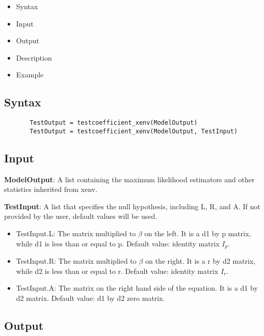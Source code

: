 \documentclass[a4paper,11pt,openany]{memoir}
\begin{document}
\begin{itemize}
\setlength{\itemsep}{-1ex}
   \item Syntax
   \item Input
   \item Output
   \item Description
   \item Example
\end{itemize}


\subsection*{Syntax}


\begin{verbatim}       TestOutput = testcoefficient_xenv(ModelOutput)
       TestOutput = testcoefficient_xenv(ModelOutput, TestInput)\end{verbatim}
    

\subsection*{Input}

\begin{par}
\textbf{ModelOutput}: A list containing the maximum likelihood estimators and other statistics inherited from xenv.
\end{par} \vspace{1em}
\begin{par}
\textbf{TestInput}: A list that specifies the null hypothesis, including L, R, and A.  If not provided by the user, default values will be used.
\end{par} \vspace{1em}
\begin{itemize}
\setlength{\itemsep}{-1ex}
   \item TestInput.L: The matrix multiplied to $\beta$ on the left.  It is a d1 by p matrix, while d1 is less than or equal to p.  Default value: identity matrix $I_p$.
   \item TestInput.R: The matrix multiplied to $\beta$ on the right.  It is a r by d2 matrix, while d2 is less than or equal to r.  Default value: identity matrix $I_r$.
   \item TestInput.A: The matrix on the right hand side of the equation.  It is a d1 by d2 matrix.  Default value: d1 by d2 zero matrix.
\end{itemize}


\subsection*{Output}
\end{document}
